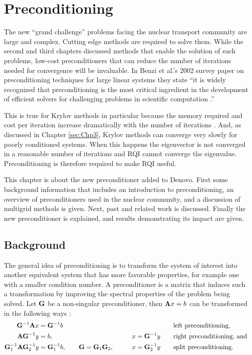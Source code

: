 
\chapter{Preconditioning}
\label{sec:Chp4}
The new ``grand challenge'' problems facing the nuclear transport community are large and complex. Cutting edge methods are required to solve them. While the second and third chapters discussed methods that enable the solution of such problems, low-cost preconditioners that can reduce the number of iterations needed for convergence will be invaluable. In Benzi et al.'s 2002 survey paper on preconditioning techniques for large linear systems they state ``it is widely recognized that preconditioning is the most critical ingredient in the development of efficient solvers for challenging problems in scientific computation \cite{Benzi2002}.'' 

This is true for Krylov methods in particular because the memory required and cost per iteration increase dramatically with the number of iterations \cite{Benzi2002}. And, as discussed in Chapter \ref{sec:Chp3}, Krylov methods can converge very slowly for poorly conditioned systems. When this happens the eigenvector is not converged in a reasonable number of iterations and RQI cannot converge the eigenvalue. Preconditioning is therefore required to make RQI useful. 

This chapter is about the new preconditioner added to Denovo. First some background information that includes an introduction to preconditioning, an overview of preconditioners used in the nuclear community, and a discussion of multigrid methods is given. Next, past and related work is discussed. Finally the new preconditioner is explained, and results demonstrating its impact are given. 

\section{Background}
The general idea of preconditioning is to transform the system of interest into another equivalent system that has more favorable properties, for example one with a smaller condition number. A preconditioner is a matrix that induces such a transformation by improving the spectral properties of the problem being solved. Let $\mathbf{G}$ be a non-singular preconditioner, then $\mathbf{A}x=b$ can be transformed in the following ways \cite{Benzi2002}: 
%
\begin{alignat}{3}
  \mathbf{G}^{-1}\mathbf{A}x &= \mathbf{G}^{-1}b  &  &\text{left preconditioning,} \\
  \mathbf{AG}^{-1}y &= b, \qquad  &x = \mathbf{G}^{-1}y \qquad &\text{right preconditioning, and } \\
  \mathbf{G}_{1}^{-1}\mathbf{AG}_{2}^{-1}y &= \mathbf{G}_{1}^{-1}b, \qquad \mathbf{G} = \mathbf{G}_{1}\mathbf{G}_{2}, \qquad  &x = \mathbf{G}_{2}^{-1}y  \qquad &\text{split preconditioning.} 
\end{alignat}

